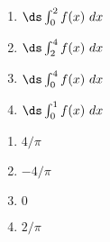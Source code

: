 {\noindent
\begin{minipage}{\linewidth}
\end{minipage}
\begin{enumerate}
\item		$\ds \int_0^2 f(x)\ dx$
\item		$\ds \int_2^4 f(x)\ dx$
\item		$\ds \int_0^4 f(x)\ dx$
\item		$\ds \int_0^1 f(x)\ dx$
\end{enumerate}

}
{\begin{enumerate}
\item		$4/\pi$
\item		$-4/\pi$
\item		$0$
\item		$2/\pi$
\end{enumerate}
}

